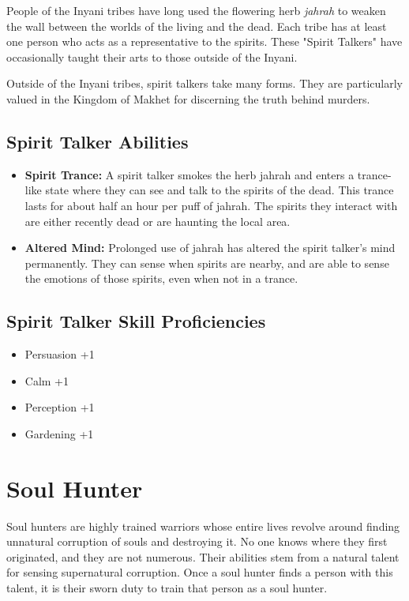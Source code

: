 \begin{multicols}{2}
People of the Inyani tribes have long used the flowering herb \textit{jahrah} 
to weaken the wall between the worlds of the living and the dead. Each tribe
has at least one person who acts as a representative to the spirits. These
"Spirit Talkers" have occasionally taught their arts to those outside of the
Inyani.

Outside of the Inyani tribes, spirit talkers take many forms. They are 
particularly valued in the Kingdom of Makhet for discerning the truth 
behind murders.

\subsection{Spirit Talker Abilities}

\begin{itemize}
    \item \textbf{Spirit Trance:} A spirit talker smokes the herb jahrah and
    enters a trance-like state where they can see and talk to the spirits of
    the dead. This trance lasts for about half an hour per puff of jahrah. The
    spirits they interact with are either recently dead or are haunting the
    local area.
    \item \textbf{Altered Mind:} Prolonged use of jahrah has altered the spirit
    talker's mind permanently. They can sense when spirits are nearby, and are
    able to sense the emotions of those spirits, even when not in a trance.
\end{itemize}

\subsection{Spirit Talker Skill Proficiencies}

\begin{itemize}
    \item Persuasion +1
    \item Calm +1
    \item Perception +1
    \item Gardening +1
\end{itemize}

\section{Soul Hunter}

Soul hunters are highly trained warriors whose entire lives revolve around
finding unnatural corruption of souls and destroying it. No one knows where
they first originated, and they are not numerous. Their abilities stem from
a natural talent for sensing supernatural corruption. Once a soul hunter 
finds a person with this talent, it is their sworn duty to train that person
as a soul hunter.


\end{multicols}
